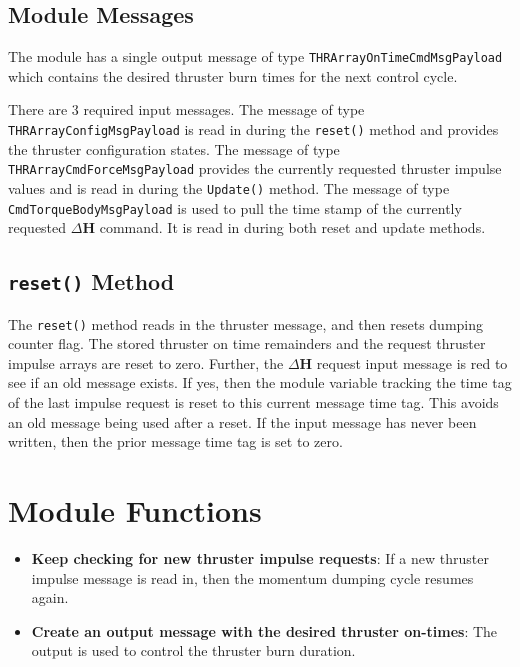\documentclass[]{BasiliskReportMemo}
\begin{document}
\subsection{Module Messages}
The module has a single output message of type {\tt THRArrayOnTimeCmdMsgPayload} which contains the desired thruster burn times for the next control cycle.

There are 3 required input messages.  The message of type {\tt THRArrayConfigMsgPayload} is read in during the {\tt reset()} method and provides the thruster configuration states.  The message of type {\tt THRArrayCmdForceMsgPayload} provides the currently requested thruster impulse values and is read in during the {\tt Update()} method.  The message of type {\tt CmdTorqueBodyMsgPayload} is used to pull the time stamp of the currently requested $\Delta {\bm H}$ command.  It is read in during both reset and update methods.

\subsection{{\tt reset()} Method}
The {\tt reset()} method reads in the thruster message, and then resets dumping counter flag.  The stored thruster on time remainders and the request thruster impulse arrays are reset to zero.  Further, the $\Delta\bm H$ request input message is red to see if an old message exists.  If yes, then the module variable tracking the time tag of the last impulse request is reset to this current message time tag. This avoids an old message being used after a reset.  If the input message has never been written, then the prior message time tag is set to zero.









\section{Module Functions}
\begin{itemize}
	\item \textbf{Keep checking for new thruster impulse requests}: If a new thruster impulse message is read in, then the momentum dumping cycle resumes again.
	\item \textbf{Create an output message with the desired thruster on-times}: The output is used to control the thruster burn duration.
\end{itemize}
\end{document}
